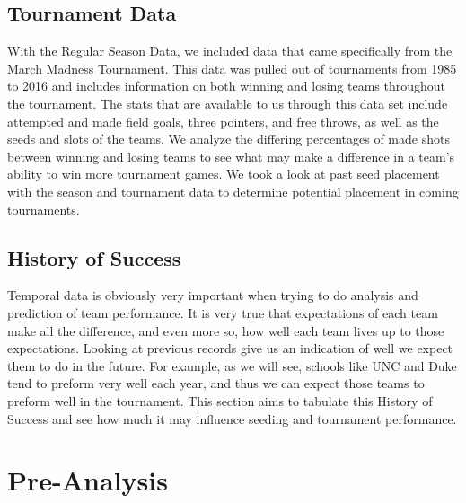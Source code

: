 \documentclass[]{scrartcl}
\begin{document}
\subsection*{Tournament Data}
With the Regular Season Data, we included data that came specifically from the March Madness Tournament. This data was pulled out of tournaments from 1985 to 2016 and includes information on both winning and losing teams throughout the tournament. The stats that are available to us through this data set include attempted and made field goals, three pointers, and free throws, as well as the seeds and slots of the teams. We analyze the differing percentages of made shots between winning and losing teams to see what may make a difference in a team's ability to win more tournament games. We took a look at past seed placement with the season and tournament data to determine potential placement in coming tournaments.
\subsection*{History of Success}

Temporal data is obviously very important when trying to do analysis and prediction of team performance. It is very true that expectations of each team make all the difference, and even more so, how well each team lives up to those expectations. Looking at previous records give us an indication of well we expect them to do in the future. For example, as we will see, schools like UNC and Duke tend to preform very well each year, and thus we can expect those teams to preform well in the tournament. This section aims to tabulate this History of Success and see how much it may influence seeding and tournament performance.
\section*{Pre-Analysis}
\end{document}

